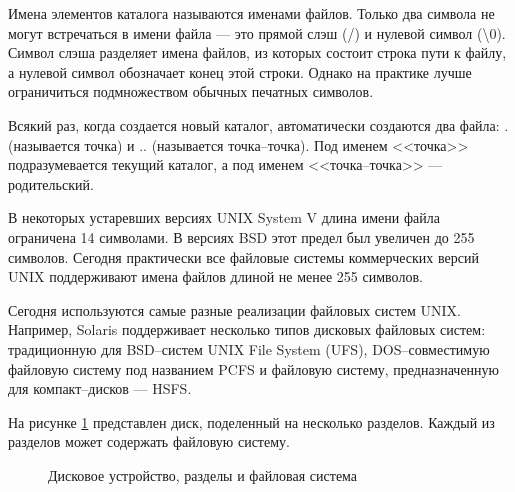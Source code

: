 Имена элементов каталога называются именами файлов. Только два символа не могут встречаться в имени файла --- это прямой слэш (/) и нулевой символ (\textbackslash 0). Символ слэша разделяет имена файлов, из которых состоит строка пути к файлу, а нулевой символ обозначает конец этой строки. Однако на практике лучше ограничиться подмножеством обычных печатных символов.

Всякий раз, когда создается новый каталог, автоматически создаются два файла: . (называется точка) и .. (называется точка--точка). Под именем <<точка>> подразумевается текущий каталог, а под именем <<точка--точка>> --- родительский. 

В некоторых устаревших версиях UNIX System V длина имени файла ограничена 14 символами. В версиях BSD этот предел был увеличен до 255 символов. Сегодня практически все файловые системы коммерческих версий UNIX поддерживают имена файлов длиной не менее 255 символов.

Сегодня используются самые разные реализации файловых систем UNIX. Например, Solaris поддерживает несколько типов дисковых файловых систем: традиционную для BSD--систем UNIX File System (UFS), DOS--совместимую файловую систему под названием PCFS и файловую систему, предназначенную для компакт--дисков --- HSFS. 

На рисунке \ref{fig:fs} представлен диск, поделенный на несколько разделов. Каждый из разделов может содержать файловую систему. 

\clearpage

\begin{figure}[ph!]
	\caption{Дисковое устройство, разделы и файловая система}
	\label{fig:fs}
\end{figure}

